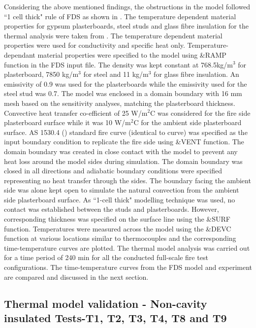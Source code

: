 Considering the above mentioned findings, the obstructions in the model followed ``1 cell thick" rule of FDS as shown in . The temperature dependent material properties for gypsum plasterboards, steel studs and glass fibre insulation for the thermal analysis were taken from \citet{Rusthi2017}. The temperature dependent material properties were used for conductivity and specific heat only. Temperature-dependant material properties were specified to the model using \&RAMP function in the FDS input file. The density was kept constant at 768.5kg/m\(^3\) for plasterboard, 7850 kg/m\(^3\) for steel and 11 kg/m\(^3\) for glass fibre insulation. An emissivity of 0.9 was used for the plasterboards while the emissivity used for the steel stud was 0.7. The model was enclosed in a domain boundary with 16 mm mesh based on the sensitivity analyses, matching the plasterboard thickness. Convective heat transfer co-efficient of 25 W/m$^2$\degree C was considered for the fire side plasterboard surface while it was 10 W/m$^2$\degree C for the ambient side plasterboard surface. AS 1530.4 (\citet{StandardsAustral2014}) standard fire curve (identical to \citet{iso834} curve) was specified as the input boundary condition to replicate the fire side using \&VENT function. The domain boundary was created in close contact with the model to prevent any heat loss around the model sides during simulation. The domain boundary was closed in all directions and adiabatic boundary conditions were specified representing no heat transfer through the sides. The boundary facing the ambient side was alone kept open to simulate the natural convection from the ambient side plasterboard surface. As ``1-cell thick" modelling technique was used, no contact was established between the studs and plasterboards. However, corresponding thickness was specified on the surface line using the \&SURF function. Temperatures were measured across the model using the \&DEVC function at various locations similar to thermocouples and the corresponding time-temperature curves are plotted. The thermal model analysis was carried out for a time period of 240 min for all the conducted full-scale fire test configurations. The time-temperature curves from the FDS model and experiment are compared and discussed in the next section.  

\subsection{Thermal model validation - Non-cavity insulated Tests-T1, T2, T3, T4, T8 and T9}

